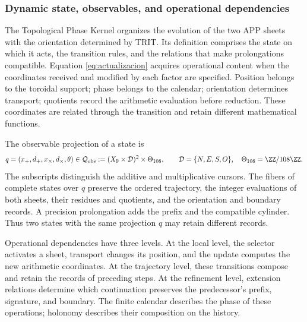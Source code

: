 
\subsubsection{Dynamic state, observables, and operational dependencies}
\label{tpk-int:estado}

The Topological Phase Kernel organizes the evolution of the two APP sheets
with the orientation determined by TRIT. Its definition comprises the state
on which it acts, the transition rules, and the relations that make
prolongations compatible. Equation \eqref{eq:actualizacion} acquires operational
content when the coordinates received and modified by each factor are specified.
Position belongs to the toroidal support; phase belongs to the calendar;
orientation determines transport; quotients record the arithmetic evaluation
before reduction. These coordinates are related through the transition and
retain different mathematical functions.

The observable projection of a state is
\begin{equation}
 q=(x_+,d_+,x_\times,d_\times,\theta)
 \in\mathcal Q_{\rm obs}
 :=(X_9\times\mathcal D)^2\times\Theta_{108},
 \qquad \mathcal D=\{N,E,S,O\},\quad
 \Theta_{108}=\ZZ/108\ZZ.
 \label{tpk-int:qobs}
\end{equation}
The subscripts distinguish the additive and multiplicative cursors. The
fibers of complete states over \(q\) preserve the ordered trajectory, the
integer evaluations of both sheets, their residues and quotients, and the
orientation and boundary records. A precision prolongation adds the prefix
and the compatible cylinder. Thus two states with the same projection
\(q\) may retain different records.

Operational dependencies have three levels. At the local level, the selector
activates a sheet, transport changes its position, and the update computes
the new arithmetic coordinates. At the trajectory level, these transitions
compose and retain the records of preceding steps. At the refinement level,
extension relations determine which continuation preserves the predecessor's
prefix, signature, and boundary. The finite calendar describes the phase
of these operations; holonomy describes their composition on the history.

